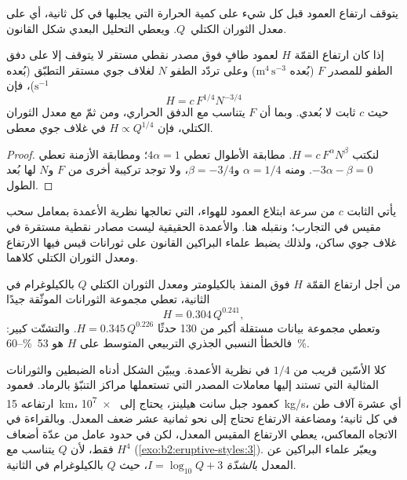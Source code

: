 يتوقف ارتفاع العمود قبل كل شيء على كمية الحرارة التي يجلبها في كل
ثانية، أي على معدل الثوران الكتلي~$Q$. ويعطي التحليل البعدي
شكل القانون.

\begin{proposition}\label{prop:b2:eruptive-styles:plume}
إذا كان ارتفاع القمّة $H$ لعمود طافٍ فوق مصدر نقطي مستقر لا يتوقف إلا
على دفق الطفو للمصدر $F$ (بُعده $\mathrm{m^4\,s^{-3}}$) وعلى
تردّد الطفو $N$ لغلاف جوي مستقر التطبّق (بُعده
$\mathrm{s^{-1}}$)، فإن
\[
H = c\,F^{1/4}N^{-3/4}
\]
حيث $c$ ثابت لا بُعدي. وبما أن $F$ يتناسب مع الدفق الحراري، ومن ثمّ
مع معدل الثوران الكتلي، فإن $H \propto Q^{1/4}$ في غلاف جوي معطى.
\end{proposition}

\begin{proof}
لنكتب $H = c\,F^{\alpha}N^{\beta}$. مطابقة الأطوال تعطي $4\alpha = 1$؛ ومطابقة
الأزمنة تعطي $-3\alpha - \beta = 0$. ومنه $\alpha = 1/4$ و$\beta = -3/4$، ولا
توجد تركيبة أخرى من $F$ و$N$ لها بُعد الطول.
\end{proof}

يأتي الثابت $c$ من سرعة ابتلاع العمود للهواء، التي تعالجها نظرية الأعمدة
بمعامل سحب مقيس في التجارب؛ ونقبله
هنا. والأعمدة الحقيقية ليست مصادر نقطية مستقرة في غلاف جوي ساكن، ولذلك
يضبط علماء البراكين القانون على ثورانات قيس فيها الارتفاع ومعدل الثوران الكتلي
كلاهما.

\begin{proposition}\label{prop:b2:eruptive-styles:mastin}
من أجل ارتفاع القمّة $H$ فوق المنفذ بالكيلومتر ومعدل الثوران الكتلي
$Q$ بالكيلوغرام في الثانية، تعطي مجموعة الثورانات الموثّقة جيدًا
\[
H = 0.304\,Q^{0.241},
\]
وتعطي مجموعة بيانات مستقلة أكبر من 130 حدثًا $H = 0.345\,Q^{0.226}$.
والتشتّت كبير: فالخطأ النسبي الجذري التربيعي المتوسط على $H$ هو
\qtyrange{53}{60}{\percent}.
\end{proposition}
\admitted

كلا الأسّين قريب من $1/4$ في نظرية الأعمدة. ويبيّن الشكل أدناه
الضبطين والثورانات المثالية التي تستند إليها معاملات المصدر التي تستعملها
مراكز التنبّؤ بالرماد. فعمود ارتفاعه \qty{15}{km}، كعمود جبل
سانت هيلينز، يحتاج إلى \qty{e7}{kg/s}، أي عشرة آلاف طن في كل ثانية؛ ومضاعفة
الارتفاع تحتاج إلى نحو ثمانية عشر ضعف المعدل. وبالقراءة في الاتجاه المعاكس، يعطي الارتفاع المقيس
المعدل، لكن في حدود عامل من عدّة أضعاف فقط، لأن $Q$ يتناسب مع $H^4$
(\cref{exo:b2:eruptive-styles:3}). ويعبّر علماء البراكين عن المعدل ب\emph{الشدّة} $I =
\log_{10}Q + 3$، حيث $Q$ بالكيلوغرام في الثانية.

